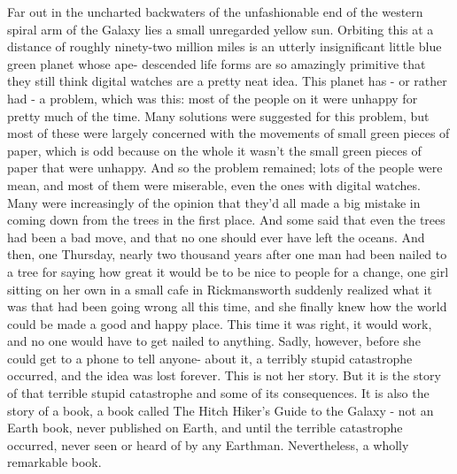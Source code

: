 \documentclass[%
    corpo=11pt,
    twoside, %
    oldstyle,
    autoretitolo,
    greek,
    evenboxes,
]{toptesi}
\begin{document}
Far out in the uncharted backwaters of the unfashionable end of
the western spiral arm of the Galaxy lies a small unregarded
yellow sun.
Orbiting this at a distance of roughly ninety-two million miles is an utterly insignificant little blue green planet whose ape- descended life forms are so amazingly primitive that they still think digital watches are a pretty neat idea.
This planet has - or rather had - a problem, which was this: most of the people on it were unhappy for pretty much of the time.
Many solutions were suggested for this problem, but most of
these were largely concerned with the movements of small green
pieces of paper, which is odd because on the whole it wasn't the small green pieces of paper that were unhappy.
And so the problem remained; lots of the people were mean, and
most of them were miserable, even the ones with digital watches.
Many were increasingly of the opinion that they'd all made a big mistake in coming down from the trees in the first place. And some said that even the trees had been a bad move, and that no one should ever have left the oceans.
And then, one Thursday, nearly two thousand years after one
man had been nailed to a tree for saying how great it would be to be nice to people for a change, one girl sitting on her own in a small cafe in Rickmansworth suddenly realized what it was that had been going wrong all this time, and she finally knew how the world could be made a good and happy place. This time it was right, it would work, and no one would have to get nailed to anything.
Sadly, however, before she could get to a phone to tell anyone-
about it, a terribly stupid catastrophe occurred, and the idea was lost forever.
This is not her story.
But it is the story of that terrible stupid catastrophe and some of its consequences.
It is also the story of a book, a book called The Hitch Hiker's
Guide to the Galaxy - not an Earth book, never published on
Earth, and until the terrible catastrophe occurred, never seen or heard of by any Earthman.
Nevertheless, a wholly remarkable book.



  \tablespagetrue     %
  \figurespagetrue   %
  \indici	             %




\end{document}

